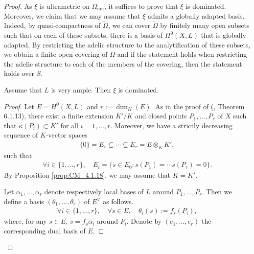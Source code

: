 \documentclass [11pt,reqno]{amsart}
\newcommand{\1}{\mathmybb{1}}
\def\um{\operatorname{um}}
\def\tilde{\widetilde}
\begin{document}
\begin{proof}

As $\xi$ is ultrametric on $\Omega_{\um}$, it suffices to prove that $\xi$ is dominated. Moreover, we claim that we may assume that $\xi$ admits a globally adapted basis. Indeed, by quasi-compactness of $\tilde{\Omega}$, we can cover $\tilde{\Omega}$ by finitely many open subsets such that on each of these subsets, there is a basis of $H^{0}(X,L)$ that is globally adapted. By restricting the adelic structure to the analytification of these subsets, we obtain a finite open covering of $\Omega$ and if the statement holds when restricting the adelic structure to each of the members of the covering, then the statement holds over $S$.

\begin{claim}
\label{claim_1}
Assume that $L$ is very ample. Then $\xi$ is dominated.
\end{claim}

\begin{proof}
Let $E= H^{0}(X,L)$ and $r:= \dim_{K}(E)$. As in the proof of (\cite{ChenMori}, Theorem 6.1.13), there exist a finite extension $K'/K$ and closed points $P_1,...,P_r$ of $X$ such that $\kappa(P_i) \subset K'$ for all $i=1,...,r$. Moreover, we have a strictly decreasing sequence of $K$-vector spaces
\begin{align*}
\{0\} = E_r \subsetneq \cdots \subsetneq E_r = E \otimes_{K} K',
\end{align*} 
such that
\begin{align*}
\forall i\in\{1,...,r\}, \quad E_i = \{s\in E_0 : s(P_1) = \cdots s(P_r) = 0\}.
\end{align*}
By Proposition \ref{prop:CM_4.1.18}, we may assume that $K=K'$. 

Let $\alpha_1,...,\alpha_r$ denote respectively local bases of $L$ around $P_1,...,P_r$. Then we define a basis $(\theta_1,...,\theta_r)$ of $E^{\vee}$ as follows. 
\begin{align*}
\forall i\in\{1,...,r\}, \quad \forall s \in E, \quad \theta_i(s) := f_{s}(P_i), 
\end{align*}
where, for any $s\in E$, $s=f_{s}\alpha_i$ around $P_i$. Denote by $(e_1,...,e_r)$ the corresponding dual basis of $E$. 


\end{proof}
\end{proof}
\end{document}
